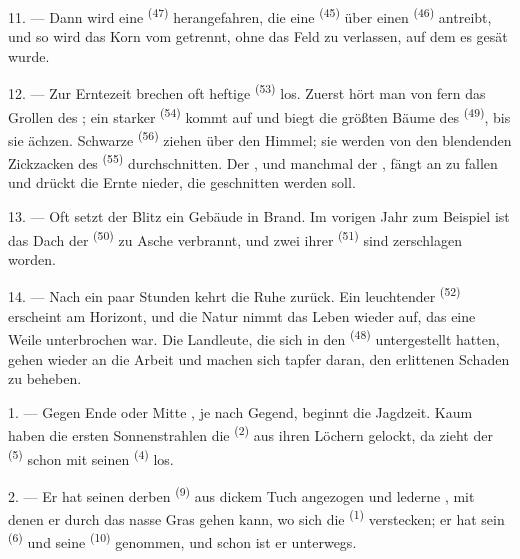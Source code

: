 11. --- Dann wird eine  \textsuperscript{(47)} herangefahren,
die eine  \textsuperscript{(45)} über einen
 \textsuperscript{(46)} antreibt, und so wird das Korn vom
 getrennt, ohne das Feld zu verlassen, auf dem es gesät wurde.

\VUsaut{5.0mm}
\VUsaut{3.4mm}

12. --- Zur Erntezeit brechen oft heftige  \textsuperscript{(53)}
los. Zuerst hört man von fern das Grollen des ; ein starker
 \textsuperscript{(54)} kommt auf und biegt die größten Bäume des
 \textsuperscript{(49)}, bis sie ächzen. Schwarze 
\textsuperscript{(56)} ziehen über den Himmel; sie werden von den blendenden
Zickzacken des  \textsuperscript{(55)} durchschnitten. Der
, und manchmal der , fängt an zu fallen und drückt die
Ernte nieder, die geschnitten werden soll.

13. --- Oft setzt der Blitz ein Gebäude in Brand. Im vorigen Jahr zum Beispiel ist
das Dach der  \textsuperscript{(50)} zu Asche verbrannt, und zwei
ihrer  \textsuperscript{(51)} sind zerschlagen worden.

14. --- Nach ein paar Stunden kehrt die Ruhe zurück. Ein leuchtender
 \textsuperscript{(52)} erscheint am Horizont, und die Natur nimmt
das Leben wieder auf, das eine Weile unterbrochen war. Die Landleute, die sich in
den  \textsuperscript{(48)} untergestellt hatten, gehen wieder an die
Arbeit und machen sich tapfer daran, den erlittenen Schaden zu beheben.

\VUsaut{6.0mm}
\VUsaut{3.6mm}

\VUsaut{1.4mm}
\VUsaut{4.0mm}

1. --- Gegen Ende  oder Mitte , je nach Gegend,
beginnt die Jagdzeit. Kaum haben die ersten Sonnenstrahlen die 
\textsuperscript{(2)} aus ihren Löchern gelockt, da zieht der 
\textsuperscript{(5)} schon mit seinen  \textsuperscript{(4)} los.

2. --- Er hat seinen derben  \textsuperscript{(9)} aus dickem Tuch
angezogen und lederne , mit denen er durch das nasse Gras gehen
kann, wo sich die  \textsuperscript{(1)} verstecken; er hat sein
 \textsuperscript{(6)} und seine 
\textsuperscript{(10)} genommen, und schon ist er unterwegs.

